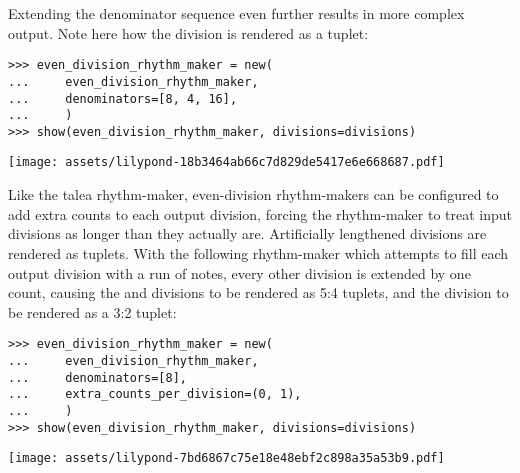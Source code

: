 \noindent Extending the denominator sequence even further results in more
complex output. Note here how the  division is rendered as a
tuplet:

\begin{comment}
<abjad>
even_division_rhythm_maker = new(
    even_division_rhythm_maker,
    denominators=[8, 4, 16],
    )
show(even_division_rhythm_maker, divisions=divisions)
</abjad>
\end{comment}

\begin{abjadbookoutput}
\begin{singlespacing}
\vspace{-0.5\baselineskip}
\begin{verbatim}
>>> even_division_rhythm_maker = new(
...     even_division_rhythm_maker,
...     denominators=[8, 4, 16],
...     )
>>> show(even_division_rhythm_maker, divisions=divisions)
\end{verbatim}
\noindent\texttt{[image: assets/lilypond-18b3464ab66c7d829de5417e6e668687.pdf]}
\end{singlespacing}
\end{abjadbookoutput}

\noindent Like the talea rhythm-maker, even-division rhythm-makers can be
configured to add extra counts to each output division, forcing the
rhythm-maker to treat input divisions as longer than they actually are.
Artificially lengthened divisions are rendered as tuplets. With the following
rhythm-maker which attempts to fill each output division with a run of
 notes, every other division is extended by one count, causing the
 and  divisions to be rendered as 5:4 tuplets, and the
 division to be rendered as a 3:2 tuplet:

\begin{comment}
<abjad>
even_division_rhythm_maker = new(
    even_division_rhythm_maker,
    denominators=[8],
    extra_counts_per_division=(0, 1),
    )
show(even_division_rhythm_maker, divisions=divisions)
</abjad>
\end{comment}

\begin{abjadbookoutput}
\begin{singlespacing}
\vspace{-0.5\baselineskip}
\begin{verbatim}
>>> even_division_rhythm_maker = new(
...     even_division_rhythm_maker,
...     denominators=[8],
...     extra_counts_per_division=(0, 1),
...     )
>>> show(even_division_rhythm_maker, divisions=divisions)
\end{verbatim}
\noindent\texttt{[image: assets/lilypond-7bd6867c75e18e48ebf2c898a35a53b9.pdf]}
\end{singlespacing}
\end{abjadbookoutput}

